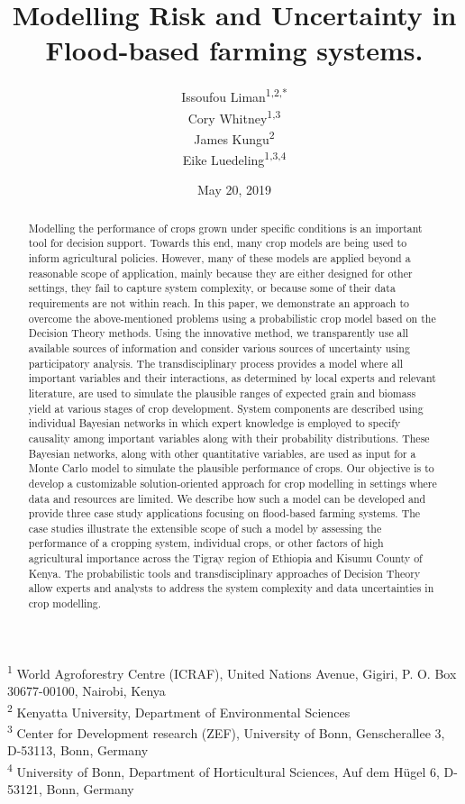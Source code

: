 \documentclass[12pt,oneside]{article}
\title{Modelling Risk and Uncertainty in Flood-based farming systems.}
\author{Issoufou Liman\textsuperscript{1,2,*} \\ Cory Whitney\textsuperscript{1,3} \\ James Kungu\textsuperscript{2} \\ Eike Luedeling\textsuperscript{1,3,4}}
\date{May 20, 2019}
\begin{document}
\maketitle
\begin{abstract}
Modelling the performance of crops grown under specific conditions is an important tool for decision support. Towards this end, many crop models are being used to inform agricultural policies. However, many of these models are applied beyond a reasonable scope of application, mainly because they are either designed for other settings, they fail to capture system complexity, or because some of their data requirements are not within reach. In this paper, we demonstrate an approach to overcome the above-mentioned problems using a probabilistic crop model based on the Decision Theory methods. Using the innovative method, we transparently use all available sources of information and consider various sources of uncertainty using participatory analysis. The transdisciplinary process provides a model where all important variables and their interactions, as determined by local experts and relevant literature, are used to simulate the plausible ranges of expected grain and biomass yield at various stages of crop development. System components are described using individual Bayesian networks in which expert knowledge is employed to specify causality among important variables along with their probability distributions. These Bayesian networks, along with other quantitative variables, are used as input for a Monte Carlo model to simulate the plausible performance of crops. Our objective is to develop a customizable solution-oriented approach for crop modelling in settings where data and resources are limited. We describe how such a model can be developed and provide three case study applications focusing on flood-based farming systems. The case studies illustrate the extensible scope of such a model by assessing the performance of a cropping system, individual crops, or other factors of high agricultural importance across the Tigray region of Ethiopia and Kisumu County of Kenya. The probabilistic tools and transdisciplinary approaches of Decision Theory allow experts and analysts to address the system complexity and data uncertainties in crop modelling.
\end{abstract}

{
\hypersetup{linkcolor=black}
\setcounter{tocdepth}{5}
\tableofcontents
}
\textsuperscript{1} World Agroforestry Centre (ICRAF), United Nations Avenue, Gigiri, P. O. Box 30677-00100, Nairobi, Kenya\\
\textsuperscript{2} Kenyatta University, Department of Environmental Sciences\\
\textsuperscript{3} Center for Development research (ZEF), University of Bonn, Genscherallee 3, D-53113, Bonn, Germany\\
\textsuperscript{4} University of Bonn, Department of Horticultural Sciences, Auf dem Hügel 6, D-53121, Bonn, Germany
\end{document}
